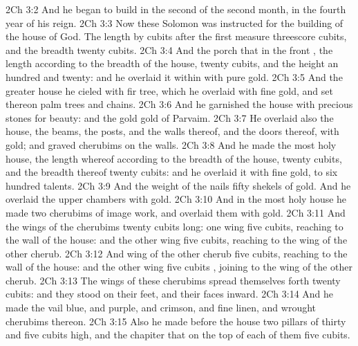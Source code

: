 \vs 2Ch 3:2 And he began to build in the second  of the second month, in the fourth year of his reign.
\vs 2Ch 3:3 Now these  Solomon was instructed for the building of the house of God. The length by cubits after the first measure  threescore cubits, and the breadth twenty cubits.
\vs 2Ch 3:4 And the porch that  in the front , the length  according to the breadth of the house, twenty cubits, and the height  an hundred and twenty: and he overlaid it within with pure gold.
\vs 2Ch 3:5 And the greater house he cieled with fir tree, which he overlaid with fine gold, and set thereon palm trees and chains.
\vs 2Ch 3:6 And he garnished the house with precious stones for beauty: and the gold  gold of Parvaim.
\vs 2Ch 3:7 He overlaid also the house, the beams, the posts, and the walls thereof, and the doors thereof, with gold; and graved cherubims on the walls.
\vs 2Ch 3:8 And he made the most holy house, the length whereof  according to the breadth of the house, twenty cubits, and the breadth thereof twenty cubits: and he overlaid it with fine gold,  to six hundred talents.
\vs 2Ch 3:9 And the weight of the nails  fifty shekels of gold. And he overlaid the upper chambers with gold.
\vs 2Ch 3:10 And in the most holy house he made two cherubims of image work, and overlaid them with gold.
\vs 2Ch 3:11 And the wings of the cherubims  twenty cubits long: one wing  five cubits, reaching to the wall of the house: and the other wing  five cubits, reaching to the wing of the other cherub.
\vs 2Ch 3:12 And  wing of the other cherub  five cubits, reaching to the wall of the house: and the other wing  five cubits , joining to the wing of the other cherub.
\vs 2Ch 3:13 The wings of these cherubims spread themselves forth twenty cubits: and they stood on their feet, and their faces  inward.
\vs 2Ch 3:14 And he made the vail  blue, and purple, and crimson, and fine linen, and wrought cherubims thereon.
\vs 2Ch 3:15 Also he made before the house two pillars of thirty and five cubits high, and the chapiter that  on the top of each of them  five cubits.
